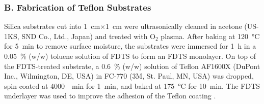 \documentclass[journal=jacsat,manuscript=article]{achemso}
\begin{document}
\subsubsection{B. Fabrication of Teflon Substrates}

Silica substrates cut into \SI{1}{\centi\metre}\(\times\)\SI{1}{\centi\metre} were ultrasonically cleaned in acetone (US-1KS, SND Co., Ltd., Japan) and treated with \(\mathrm{O}_2\) plasma. After baking at \SI{120}{\degreeCelsius} for \SI{5}{\minute} to remove surface moisture, the substrates were immersed for \SI{1}{\hour} in a \SI{0.05}{\percent} (w/w) toluene solution of FDTS to form an FDTS monolayer. On top of the FDTS-treated substrate, a \SI{0.6}{\percent} (w/w) solution of Teflon AF1600X (DuPont Inc., Wilmington, DE, USA) in FC-770 (3M, St. Paul, MN, USA) was dropped, spin-coated at \SI{4000}{\per\minute} for \SI{1}{\minute}, and baked at \SI{175}{\degreeCelsius} for \SI{10}{\minute}. The FDTS underlayer was used to improve the adhesion of the Teflon coating \cite{Makohliso1998-av}.
\end{document}
